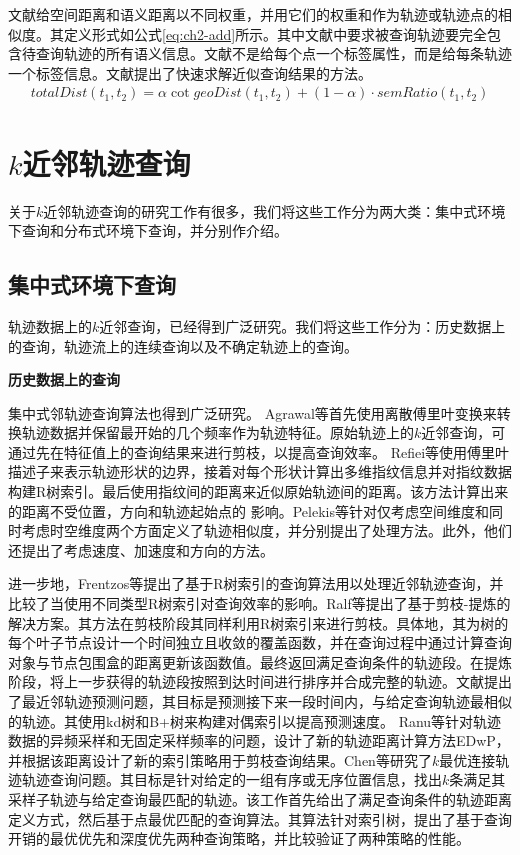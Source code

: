 文献\cite{Kaiser,ShangDYXZK12,ZhengYZXSZ15}给空间距离和语义距离以不同权重，并用它们的权重和作为轨迹或轨迹点的相似度。其定义形式如公式\ref{eq:ch2-add}所示。其中文献\cite{Kaiser}中要求被查询轨迹要完全包含待查询轨迹的所有语义信息。文献\cite{ShangDYXZK12}不是给每个点一个标签属性，而是给每条轨迹一个标签信息。文献\cite{ZhengYZXSZ15}提出了快速求解近似查询结果的方法。
\begin{eqnarray}\label{eq:ch2-add}
totalDist(t_{1},t_{2}) = \alpha \cot  geoDist(t_{1},t_{2}) + (1-\alpha) \cdot  semRatio(t_{1},t_{2})
\end{eqnarray}


\section{$k$近邻轨迹查询}\label{sec-c2-topk}
关于$k$近邻轨迹查询的研究工作有很多，我们将这些工作分为两大类：集中式环境下查询和分布式环境下查询，并分别作介绍。

\subsection{集中式环境下查询}
轨迹数据上的$k$近邻查询，已经得到广泛研究。我们将这些工作分为：历史数据上的查询，轨迹流上的连续查询以及不确定轨迹上的查询。

\textbf{历史数据上的查询}

集中式邻轨迹查询算法也得到广泛研究。
Agrawal等首先使用离散傅里叶变换来转换轨迹数据并保留最开始的几个频率作为轨迹特征\cite{AgrawalFS93}。原始轨迹上的$k$近邻查询，可通过先在特征值上的查询结果来进行剪枝，以提高查询效率。
Refiei等使用傅里叶描述子来表示轨迹形状的边界，接着对每个形状计算出多维指纹信息并对指纹数据构建R树索引\cite{RafieiM02}。最后使用指纹间的距离来近似原始轨迹间的距离。该方法计算出来的距离不受位置，方向和轨迹起始点的 影响。Pelekis等针对仅考虑空间维度和同时考虑时空维度两个方面定义了轨迹相似度，并分别提出了处理方法\cite{Pelekis}。此外，他们还提出了考虑速度、加速度和方向的方法。

进一步地，Frentzos等提出了基于R树索引的查询算法用以处理近邻轨迹查询，并比较了当使用不同类型R树索引对查询效率的影响\cite{FrentzosGPT07}。Ralf等提出了基于剪枝-提炼的解决方案\cite{GutingBX10}。其方法在剪枝阶段其同样利用R树索引来进行剪枝。具体地，其为树的每个叶子节点设计一个时间独立且收敛的覆盖函数，并在查询过程中通过计算查询对象与节点包围盒的距离更新该函数值。最终返回满足查询条件的轨迹段。在提炼阶段，将上一步获得的轨迹段按照到达时间进行排序并合成完整的轨迹。文献\cite{KolliosGT99}提出了最近邻轨迹预测问题，其目标是预测接下来一段时间内，与给定查询轨迹最相似的轨迹。其使用kd树和B+树来构建对偶索引以提高预测速度。
Ranu等针对轨迹数据的异频采样和无固定采样频率的问题，设计了新的轨迹距离计算方法EDwP，并根据该距离设计了新的索引策略用于剪枝查询结果\cite{RanuPTDR15}。Chen等研究了$k$最优连接轨迹轨迹查询问题\cite{ChenSZZX10}。其目标是针对给定的一组有序或无序位置信息，找出$k$条满足其采样子轨迹与给定查询最匹配的轨迹。该工作首先给出了满足查询条件的轨迹距离定义方式，然后基于点最优匹配的查询算法。其算法针对索引树，提出了基于查询开销的最优优先和深度优先两种查询策略，并比较验证了两种策略的性能。

